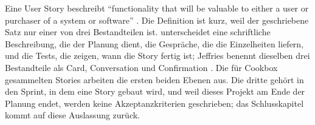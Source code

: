 %
%
%
%
%
%
Eine User Story beschreibt \enquote{functionality that will be valuable to either a
user or purchaser of a system or software} \parencite[p.~4]{cohn2004}. Die
Definition ist kurz, weil der geschriebene Satz nur einer von drei Bestandteilen
ist. \textcite[p.~4]{cohn2004} unterscheidet eine schriftliche Beschreibung, die
der Planung dient, die Gespräche, die die Einzelheiten liefern, und die Tests,
die zeigen, wann die Story fertig ist; Jeffries benennt dieselben drei
Bestandteile als Card, Conversation und Confirmation \parencite[p.~4]{cohn2004}. Die für Cookbox gesammelten Stories arbeiten die
ersten beiden Ebenen aus. Die dritte gehört in den Sprint, in dem eine Story
gebaut wird, und weil dieses Projekt am Ende der Planung endet, werden keine
Akzeptanzkriterien geschrieben; das Schlusskapitel kommt auf diese Auslassung
zurück.



